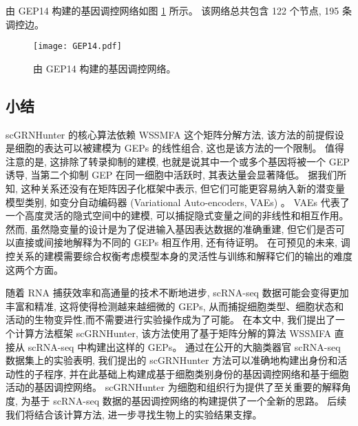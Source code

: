 由 GEP14 构建的基因调控网络如图 \ref{fig:gep-grn-gep14} 所示。
该网络总共包含 122 个节点, 195 条调控边。
\begin{figure}[!htbp]
    \centering
    \texttt{[image: GEP14.pdf]}
    \caption{由 GEP14 构建的基因调控网络。}
    \label{fig:gep-grn-gep14}
\end{figure}


\subsection{小结}
scGRNHunter 的核心算法依赖 WSSMFA 这个矩阵分解方法,
该方法的前提假设是细胞的表达可以被建模为 GEPs 的线性组合,
这也是该方法的一个限制。
值得注意的是, 这排除了转录抑制的建模, 也就是说其中一个或多个基因将被一个 GEP 诱导,
当第二个抑制 GEP 在同一细胞中活跃时, 其表达量会显著降低。
据我们所知, 这种关系还没有在矩阵因子化框架中表示, 但它们可能更容易纳入新的潜变量模型类别,
如变分自动编码器 (Variational Auto-encoders, VAEs) \cite{ding2018interpretable,gronbech2018scvae}。
VAEs 代表了一个高度灵活的隐式空间中的建模, 可以捕捉隐式变量之间的非线性和相互作用。
然而, 虽然隐变量的设计是为了促进输入基因表达数据的准确重建, 
但它们是否可以直接或间接地解释为不同的 GEPs 相互作用, 还有待证明。
在可预见的未来, 调控关系的建模需要综合权衡考虑模型本身的灵活性与训练和解释它们的输出的难度这两个方面。

随着 RNA 捕获效率和高通量的技术不断地进步, scRNA-seq 数据可能会变得更加丰富和精准,
这将使得检测越来越细微的 GEPs, 从而捕捉细胞类型、细胞状态和活动的生物变异性,而不需要进行实验操作成为了可能。
在本文中, 我们提出了一个计算方法框架 scGRNHunter,
该方法使用了基于矩阵分解的算法 WSSMFA 直接从 scRNA-seq 中构建出这样的 GEPs。 
通过在公开的大脑类器官 scRNA-seq 数据集上的实验表明,
我们提出的 scGRNHunter 方法可以准确地构建出身份和活动性的子程序, 
并在此基础上构建成基于细胞类别身份的基因调控网络和基于细胞活动的基因调控网络。
scGRNHunter 为细胞和组织行为提供了至关重要的解释角度,
为基于 scRNA-seq 数据的基因调控网络的构建提供了一个全新的思路。
后续我们将结合该计算方法, 进一步寻找生物上的实验结果支撑。